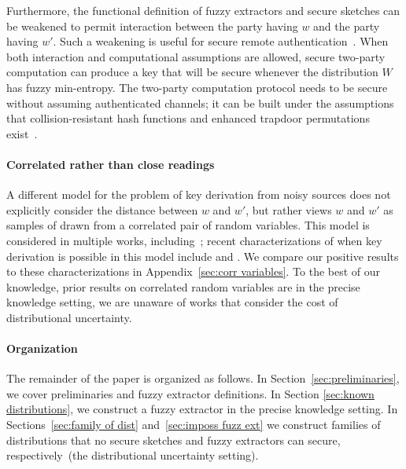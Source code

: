 \documentclass[11pt]{article}
\newcommand{\secref}[1]{\mbox{Section~\ref{#1}}}
\newcommand{\apref}[1]{\mbox{Appendix~\ref{#1}}}
\begin{document}
Furthermore, the functional definition of fuzzy extractors and secure sketches can be weakened to permit interaction between the party having $w$ and the party having $w'$. Such a weakening is useful for secure remote authentication~\cite{Boyen05secureremote}. When both interaction and computational assumptions are allowed, secure two-party computation can produce a key that will be secure whenever the distribution $W$ has fuzzy min-entropy.  The two-party computation protocol needs to be secure without assuming authenticated channels; it can be built under the assumptions that collision-resistant hash functions and enhanced trapdoor permutations exist~\cite{DBLP:journals/joc/BarakCLPR11}.

\paragraph{Correlated rather than close readings}
A different model for the problem of key derivation from noisy sources does not explicitly consider the distance between $w$ and $w'$, but rather views $w$ and $w'$ as samples of drawn from a correlated pair of random variables.   This model is considered in multiple works, including~\cite{wyner1975wire,DBLP:journals/tit/CsiszarK78,DBLP:journals/tit/AhlswedeC93,DBLP:journals/tit/Maurer93}; recent characterizations of when key derivation is possible in this model include \cite{DBLP:conf/asiacrypt/RennerW05} and \cite{DBLP:journals/corr/TyagiW14}.  We compare our positive results to these characterizations in \apref{sec:corr variables}.  To the best of our knowledge, prior results on correlated random variables are in the precise knowledge setting, we are unaware of works that consider the cost of distributional uncertainty.

\paragraph{Organization} The remainder of the paper is organized as follows.  In \secref{sec:preliminaries}, we cover preliminaries and fuzzy extractor definitions.  In Section \ref{sec:known distributions}, we construct a fuzzy extractor in the precise knowledge setting.  In Sections~\ref{sec:family of dist} and~\ref{sec:imposs fuzz ext} we construct families of distributions that no secure sketches and fuzzy extractors can secure, respectively~(the distributional uncertainty setting).
\end{document}
